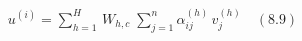 \documentclass[preview]{standalone}
\begin{document}
\begin{align*}
u^{(i)} = \sum_{h=1}^{H} \,W_{h,c}\;\sum_{j=1}^{n}\alpha_{ij}^{(h)}\,v_{j}^{(h)}\quad (8.9)
\end{align*}
\end{document}
